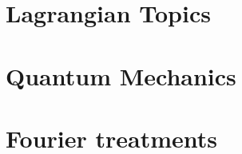 \part{Lagrangian Topics}
   
   
   
   
   
   

\part{Quantum Mechanics}
   
   
   
   
   
   
   
   

\part{Fourier treatments}
   
   
   
   
   
   
   
   
   


